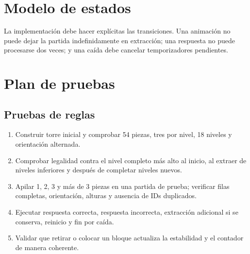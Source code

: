 \documentclass[11pt,letterpaper]{article}
\begin{document}
\section{Modelo de estados}

\begin{center}
\end{center}

La implementación debe hacer explícitas las transiciones. Una animación no puede dejar la partida indefinidamente en extracción; una respuesta no puede procesarse dos veces; y una caída debe cancelar temporizadores pendientes.

\section{Plan de pruebas}

\subsection{Pruebas de reglas}
\begin{enumerate}
  \item Construir torre inicial y comprobar 54 piezas, tres por nivel, 18 niveles y orientación alternada.
  \item Comprobar legalidad contra el nivel completo más alto al inicio, al extraer de niveles inferiores y después de completar niveles nuevos.
  \item Apilar 1, 2, 3 y más de 3 piezas en una partida de prueba; verificar filas completas, orientación, alturas y ausencia de IDs duplicados.
  \item Ejecutar respuesta correcta, respuesta incorrecta, extracción adicional si se conserva, reinicio y fin por caída.
  \item Validar que retirar o colocar un bloque actualiza la estabilidad y el contador de manera coherente.
\end{enumerate}
\end{document}
